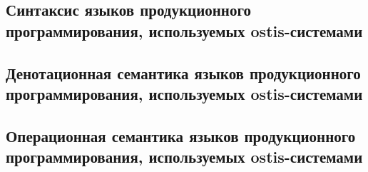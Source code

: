 \subsection{Синтаксис языков продукционного программирования, используемых ostis-системами}
\subsection{Денотационная семантика языков продукционного программирования, используемых ostis-системами}
\subsection{Операционная семантика языков продукционного программирования, используемых ostis-системами}

%